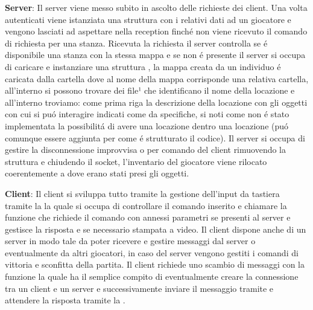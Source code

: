 \documentclass[12pt]{article}
\begin{document}
\vspace{0.1in}

\textbf{Server}: Il server viene messo subito in ascolto delle richieste dei client. Una volta autenticati viene istanziata una struttura  con i relativi dati ad un giocatore e vengono lasciati ad aspettare nella reception finché non viene ricevuto il comando di richiesta per una stanza. Ricevuta la richiesta il server controlla se é disponibile una stanza con la stessa mappa e se non é presente il server si occupa di caricare e instanziare una struttura , la mappa creata da un individuo é caricata dalla cartella  dove al nome della mappa corrisponde una relativa cartella, all'interno si possono trovare dei file¹ che identificano il nome della locazione e all'interno troviamo: come prima riga la descrizione della locazione con gli oggetti con cui si puó interagire indicati come da specifiche, si noti come non é stato implementata la possibilitá di avere una locazione dentro una locazione (puó comunque essere aggiunta per come é strutturato il codice). Il server si occupa di gestire la disconnessione improvvisa o per comando  del client rimuovendo la struttura  e chiudendo il socket, l'inventario del giocatore viene rilocato coerentemente a dove erano stati presi gli oggetti.

\textbf{Client}: Il client si sviluppa tutto tramite la gestione dell'input da tastiera tramite la  la quale si occupa di controllare il comando inserito e chiamare la funzione che richiede il comando con annessi parametri se presenti al server e gestisce la risposta e se necessario stampata a video. Il client dispone anche di un server in modo tale da poter ricevere e gestire messaggi dal server o eventualmente da altri giocatori, in caso del server vengono gestiti i comandi di vittoria e sconfitta della partita. Il client richiede uno scambio di messaggi con la funzione  la quale ha il semplice compito di eventualmente creare la connessione tra un client e un server e successivamente inviare il messaggio tramite  e attendere la risposta tramite la .
\end{document}
